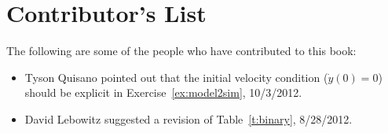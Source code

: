 \vspace{0.5in}
\section*{Contributor's List}
The following are some of the people who have contributed to this book:
\begin{itemize}
\item Tyson Quisano pointed out that the initial velocity condition ($\dot{y}(0)=0$) should be explicit in Exercise~\ref{ex:model2sim}, 10/3/2012.
\item David Lebowitz suggested a revision of Table~\ref{t:binary}, 8/28/2012.
\end{itemize}

